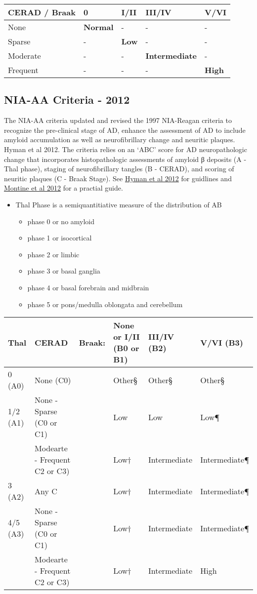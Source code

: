\documentclass[]{book}
\providecommand{\tightlist}{%
  \setlength{\itemsep}{0pt}\setlength{\parskip}{0pt}}
\begin{document}
\begin{longtable}[]{@{}lllll@{}}
\toprule
CERAD / Braak & 0 & I/II & III/IV & V/VI\tabularnewline
\midrule
\endhead
None & \textbf{Normal} & - & - & -\tabularnewline
Sparse & - & \textbf{Low} & - & -\tabularnewline
Moderate & - & - & \textbf{Intermediate} & -\tabularnewline
Frequent & - & - & - & \textbf{High}\tabularnewline
\bottomrule
\end{longtable}

\hypertarget{nia-aa-criteria---2012}{%
\subsection{NIA-AA Criteria - 2012}\label{nia-aa-criteria---2012}}

The NIA-AA criteria updated and revised the 1997 NIA-Reagan criteria to recognize the pre-clinical stage of AD, enhance the assessment of AD to include amyloid accumulation as well as neurofibrillary change and neuritic plaques. Hyman et al 2012. The criteria relies on an `ABC' score for AD neuropathologic change that incorporates histopathologic assessments of amyloid β deposits (A - Thal phase), staging of neurofibrillary tangles (B - CERAD), and scoring of neuritic plaques (C - Braak Stage). See \href{https://doi.org/10.1016/j.jalz.2011.10.007}{Hyman et al 2012} for guidlines and \href{https://doi.org/10.1007/s00401-011-0910-3}{Montine et al 2012} for a practial guide.

\begin{itemize}
\tightlist
\item
  Thal Phase is a semiquantitiative measure of the distribution of AB

  \begin{itemize}
  \tightlist
  \item
    phase 0 or no amyloid
  \item
    phase 1 or isocortical
  \item
    phase 2 or limbic
  \item
    phase 3 or basal ganglia
  \item
    phase 4 or basal forebrain and midbrain
  \item
    phase 5 or pons/medulla oblongata and cerebellum
  \end{itemize}
\end{itemize}

\begin{longtable}[]{@{}llllll@{}}
\toprule
Thal & CERAD & Braak: & None or I/II (B0 or B1) & III/IV (B2) & V/VI (B3)\tabularnewline
\midrule
\endhead
0 (A0) & None (C0) & & Other§ & Other§ & Other§\tabularnewline
1/2 (A1) & None - Sparse (C0 or C1) & & Low & Low & Low¶\tabularnewline
& Modearte - Frequent C2 or C3) & & Low† & Intermediate & Intermediate¶\tabularnewline
3 (A2) & Any C & & Low† & Intermediate & Intermediate¶\tabularnewline
4/5 (A3) & None - Sparse (C0 or C1) & & Low† & Intermediate & Intermediate¶\tabularnewline
& Modearte - Frequent C2 or C3) & & Low† & Intermediate & High\tabularnewline
\bottomrule
\end{longtable}
\end{document}
